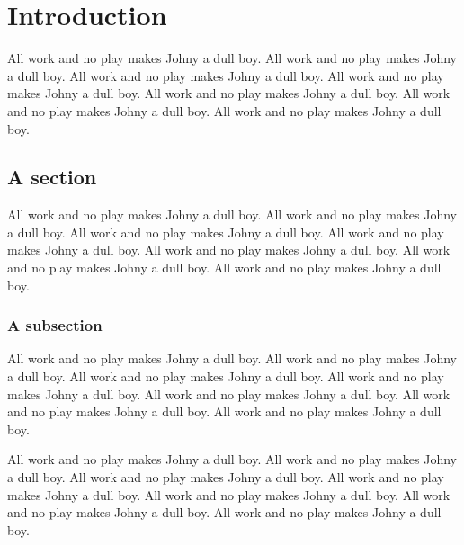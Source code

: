 \documentclass[12pt]{orstthesis}
\begin{document}
\frontmatter
\flyleaf
{}
\copyrightpage
\osutitle
\approval
{}
\tableofcontents
\newpage
\listoffigures
\newpage
\listoftables
\newpage
\mainmatter
\doublespacing
\chapter{Introduction}
All work and no play makes Johny a dull boy.
All work and no play makes Johny a dull boy.
All work and no play makes Johny a dull boy.
All work and no play makes Johny a dull boy.
All work and no play makes Johny a dull boy.
All work and no play makes Johny a dull boy.
All work and no play makes Johny a dull boy.
\section{A section}
All work and no play makes Johny a dull boy.
All work and no play makes Johny a dull boy.
All work and no play makes Johny a dull boy.
All work and no play makes Johny a dull boy.
All work and no play makes Johny a dull boy.
All work and no play makes Johny a dull boy.
All work and no play makes Johny a dull boy.
\subsection{A subsection}
All work and no play makes Johny a dull boy.
All work and no play makes Johny a dull boy.
All work and no play makes Johny a dull boy.
All work and no play makes Johny a dull boy.
All work and no play makes Johny a dull boy.
All work and no play makes Johny a dull boy.
All work and no play makes Johny a dull boy.
\begin{table}
\caption[
All work and no play makes Johny a dull boy.
]{
All work and no play makes Johny a dull boy.
All work and no play makes Johny a dull boy.
All work and no play makes Johny a dull boy.
All work and no play makes Johny a dull boy.
All work and no play makes Johny a dull boy.
All work and no play makes Johny a dull boy.
All work and no play makes Johny a dull boy.
}
\end{table}
\end{document}
